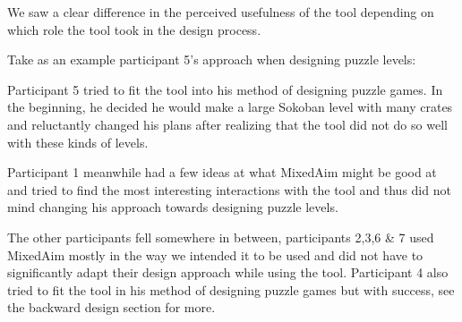 We saw a clear difference in the perceived usefulness of the tool depending on which role the tool took in the design process.

Take as an example participant 5's approach when designing puzzle levels: \\
\hspace{\dimexpr-\fboxrule-\fboxsep\relax}


Participant 5 tried to fit the tool into his method of designing puzzle games. In the beginning, he decided he would make a large Sokoban level with many crates and reluctantly changed his plans after realizing that the tool did not do so well with these kinds of levels.

Participant 1 meanwhile had a few ideas at what MixedAim might be good at and tried to find the most interesting interactions with the tool and thus did not mind changing his approach towards designing puzzle levels.

The other participants fell somewhere in between, participants 2,3,6 \& 7 used MixedAim mostly in the way we intended it to be used and did not have to significantly adapt their design approach while using the tool. Participant 4 also tried to fit the tool in his method of designing puzzle games but with success, see the backward design section for more.

